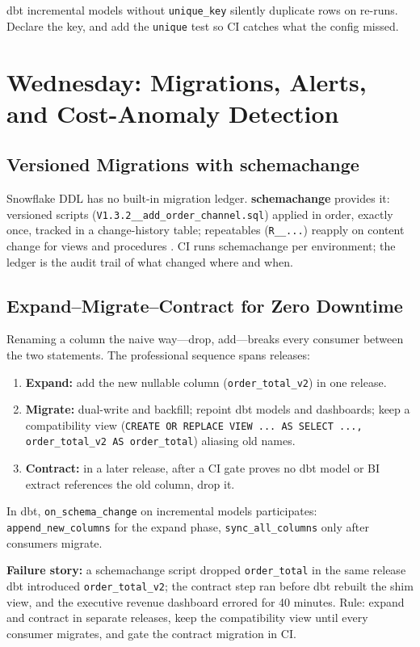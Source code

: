 \begin{tipbox}
dbt incremental models without \texttt{unique\_key} silently duplicate rows on re-runs. Declare the key, and add the \texttt{unique} test so CI catches what the config missed.
\end{tipbox}

\section{Wednesday: Migrations, Alerts, and Cost-Anomaly Detection}
\subsection{Versioned Migrations with schemachange}
Snowflake DDL has no built-in migration ledger. \textbf{schemachange} provides it: versioned scripts (\texttt{V1.3.2\_\_add\_order\_channel.sql}) applied in order, exactly once, tracked in a change-history table; repeatables (\texttt{R\_\_...}) reapply on content change for views and procedures \cite{schemachangeDocs}. CI runs schemachange per environment; the ledger is the audit trail of what changed where and when.

\subsection{Expand--Migrate--Contract for Zero Downtime}
Renaming a column the naive way---drop, add---breaks every consumer between the two statements. The professional sequence spans releases:
\begin{enumerate}
    \item \textbf{Expand:} add the new nullable column (\texttt{order\_total\_v2}) in one release.
    \item \textbf{Migrate:} dual-write and backfill; repoint dbt models and dashboards; keep a compatibility view (\texttt{CREATE OR REPLACE VIEW ... AS SELECT ..., order\_total\_v2 AS order\_total}) aliasing old names.
    \item \textbf{Contract:} in a later release, after a CI gate proves no dbt model or BI extract references the old column, drop it.
\end{enumerate}
In dbt, \texttt{on\_schema\_change} on incremental models participates: \texttt{append\_new\_columns} for the expand phase, \texttt{sync\_all\_columns} only after consumers migrate.

\begin{pitfall}
\textbf{Failure story:} a schemachange script dropped \texttt{order\_total} in the same release dbt introduced \texttt{order\_total\_v2}; the contract step ran before dbt rebuilt the shim view, and the executive revenue dashboard errored for 40 minutes. Rule: expand and contract in separate releases, keep the compatibility view until every consumer migrates, and gate the contract migration in CI.
\end{pitfall}

